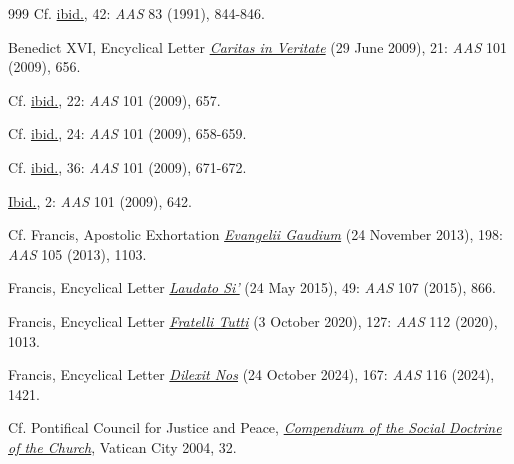 \documentclass{article}
\begin{document}
\begin{thebibliography}{999}
 Cf. \href{https://www.vatican.va/content/john-paul-ii/en/encyclicals/documents/hf_jp-ii_enc_01051991_centesimus-annus.html}{ibid.}, 42: \emph{AAS} 83 (1991), 844-846.

 Benedict XVI, Encyclical Letter \href{https://www.vatican.va/content/benedict-xvi/en/encyclicals/documents/hf_ben-xvi_enc_20090629_caritas-in-veritate.html}{\emph{Caritas in Veritate}} (29 June 2009), 21: \emph{AAS} 101 (2009), 656.

 Cf. \href{https://www.vatican.va/content/benedict-xvi/en/encyclicals/documents/hf_ben-xvi_enc_20090629_caritas-in-veritate.html}{ibid.}, 22: \emph{AAS} 101 (2009), 657.

 Cf. \href{https://www.vatican.va/content/benedict-xvi/en/encyclicals/documents/hf_ben-xvi_enc_20090629_caritas-in-veritate.html}{ibid.}, 24: \emph{AAS} 101 (2009), 658-659.

 Cf. \href{https://www.vatican.va/content/benedict-xvi/en/encyclicals/documents/hf_ben-xvi_enc_20090629_caritas-in-veritate.html}{ibid.}, 36: \emph{AAS} 101 (2009), 671-672.

 \href{https://www.vatican.va/content/benedict-xvi/en/encyclicals/documents/hf_ben-xvi_enc_20090629_caritas-in-veritate.html}{Ibid.}, 2: \emph{AAS} 101 (2009), 642.

 Cf. Francis, Apostolic Exhortation \href{https://www.vatican.va/content/francesco/en/apost_exhortations/documents/papa-francesco_esortazione-ap_20131124_evangelii-gaudium.html}{\emph{Evangelii Gaudium}} (24 November 2013), 198: \emph{AAS} 105 (2013), 1103.

 Francis, Encyclical Letter \href{https://www.vatican.va/content/francesco/en/encyclicals/documents/papa-francesco_20150524_enciclica-laudato-si.html}{\emph{Laudato Si'}} (24 May 2015), 49: \emph{AAS} 107 (2015), 866.

 Francis, Encyclical Letter \href{https://www.vatican.va/content/francesco/en/encyclicals/documents/papa-francesco_20201003_enciclica-fratelli-tutti.html}{\emph{Fratelli Tutti}} (3 October 2020), 127: \emph{AAS} 112 (2020), 1013.

 Francis, Encyclical Letter \href{https://www.vatican.va/content/francesco/en/encyclicals/documents/20241024-enciclica-dilexit-nos.html}{\emph{Dilexit Nos}} (24 October 2024), 167: \emph{AAS} 116 (2024), 1421.

 Cf. Pontifical Council for Justice and Peace, \href{https://www.vatican.va/roman_curia/pontifical_councils/justpeace/documents/rc_pc_justpeace_doc_20060526_compendio-dott-soc_en.html}{\emph{Compendium of the Social Doctrine of the Church}}, Vatican City 2004, 32.


\end{thebibliography}
\end{document}
